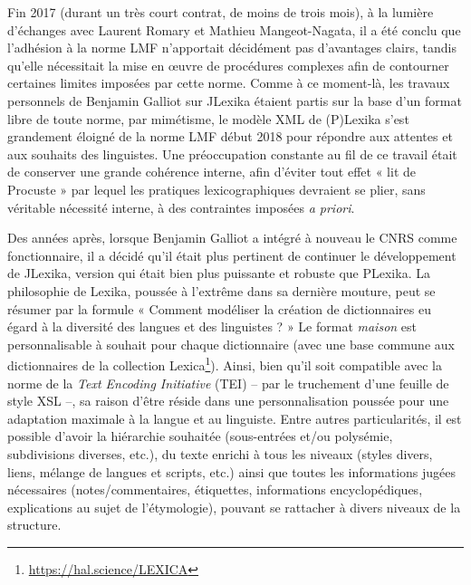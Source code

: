 Fin 2017 (durant un très court contrat, de moins de trois mois), à la lumière d'échanges avec Laurent Romary et Mathieu Mangeot-Nagata, il a été conclu que l'adhésion à la norme LMF n'apportait décidément pas d'avantages clairs, tandis qu'elle nécessitait la mise en œuvre de procédures complexes afin de contourner certaines limites imposées par cette norme. Comme à ce moment-là, les travaux personnels de Benjamin Galliot sur JLexika étaient partis sur la base d’un format libre de toute norme, par mimétisme, le modèle XML de (P)Lexika s’est grandement éloigné de la norme LMF début 2018 pour répondre aux attentes et aux souhaits
des linguistes. Une préoccupation constante au fil de ce travail était de conserver une grande cohérence interne, afin d'éviter tout effet « lit de Procuste » par lequel les pratiques lexicographiques devraient se plier, sans véritable nécessité interne, à des contraintes imposées \emph{a priori}.

Des années après, lorsque Benjamin Galliot a intégré à nouveau le CNRS comme fonctionnaire, il a décidé qu’il était plus pertinent de continuer le développement de JLexika, version qui était bien plus puissante et robuste que PLexika. La philosophie de Lexika, poussée à l’extrême dans sa dernière mouture, peut se résumer par la formule « Comment modéliser la création de dictionnaires eu égard à la diversité des langues et des linguistes ? » Le format \emph{maison} est personnalisable à souhait pour chaque dictionnaire (avec une base commune aux dictionnaires de la collection Lexica\footnote{\url{https://hal.science/LEXICA}}). Ainsi, bien qu’il soit compatible avec la norme de la \emph{Text Encoding Initiative} (TEI) – par le truchement d’une feuille de style XSL –, sa raison d’être réside dans une personnalisation poussée pour une adaptation maximale à la langue et au linguiste. Entre autres particularités, il est possible d’avoir la hiérarchie souhaitée (sous-entrées et/ou polysémie, subdivisions diverses, etc.), du texte enrichi à tous les niveaux (styles divers, liens, mélange de langues et scripts, etc.) ainsi que toutes les informations jugées nécessaires (notes/commentaires, étiquettes, informations encyclopédiques, explications au sujet de l'étymologie), pouvant se rattacher à divers niveaux de la structure.

